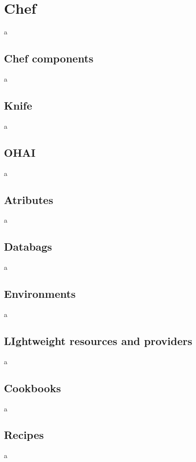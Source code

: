 \chapter{Chef}

a

\section{Chef components}

a

\section{Knife}

a

\section{OHAI}

a

\section{Atributes}

a

\section{Databags}

a

\section{Environments}

a

\section{LIghtweight resources and providers}

a

\section{Cookbooks}

a

\section{Recipes}

a
